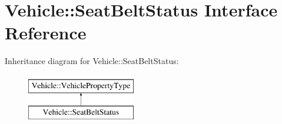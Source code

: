 \hypertarget{interfaceVehicle_1_1SeatBeltStatus}{\section{Vehicle\-:\-:Seat\-Belt\-Status Interface Reference}
\label{interfaceVehicle_1_1SeatBeltStatus}
}
Inheritance diagram for Vehicle\-:\-:Seat\-Belt\-Status\-:\begin{figure}[H]
\begin{center}
\leavevmode
\includegraphics[height=2.000000cm]{interfaceVehicle_1_1SeatBeltStatus}
\end{center}
\end{figure}
